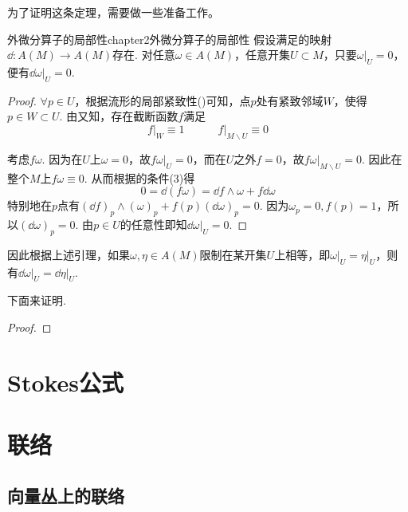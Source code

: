 为了证明这条定理，需要做一些准备工作。

\begin{mylem}{外微分算子的局部性}{chapter2外微分算子的局部性}
	假设满足的映射$\dd:A(M)\longrightarrow A(M)$存在. 对任意$\omega\in A(M)$，任意开集$U\subset M$，只要$\left.\omega \right|_{U}=0$，便有$\left.\dd \omega \right|_{U}=0$.
\end{mylem}

\begin{proof}
	$\forall p\in U$，根据流形的局部紧致性()可知，点$p$处有紧致邻域$W$，使得$p\in W\subset U$. 由又知，存在截断函数$f$满足
	\[
	\left. f \right|_{W}\equiv 1\quad\quad\quad \left.f \right|_{M\backslash U}\equiv 0
	\]

	考虑$f\omega$. 因为在$U$上$\omega=0$，故$\left. f\omega \right|_{U}=0$，而在$U$之外$f=0$，故$\left.f \omega\right|_{M\backslash U}= 0$. 因此在整个$M$上$f\omega\equiv 0$. 从而根据的条件(3)得
	\[
	0=\dd (f\omega)=\dd f\wedge \omega +f\dd \omega
	\]
	特别地在$p$点有$\left( \dd f \right)_{p}\wedge \left( \omega \right)_{p} +f(p)\left( \dd \omega \right)_{p}=0$. 因为$\omega_{p}=0,f(p)=1$，所以$\left( \dd \omega \right)_{p}=0$. 由$p\in U$的任意性即知$\left.\dd \omega \right|_{U}=0$.
\end{proof}

因此根据上述引理，如果$\omega,\eta\in A(M)$限制在某开集$U$上相等，即$\left.\omega \right|_{U}=\left.\eta \right|_{U}$，则有$\left.\dd\omega \right|_{U}=\left.\dd\eta \right|_{U}$.


下面来证明.
\begin{proof}
	
\end{proof}


\section{Stokes公式}

\section{联络}

\subsection{向量丛上的联络}

